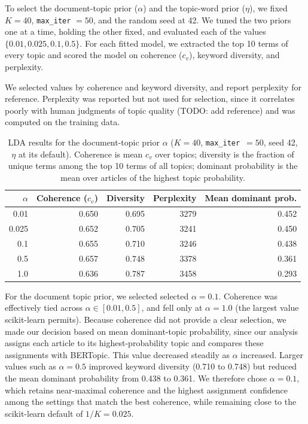 \documentclass[conference]{IEEEtran}
\begin{document}
To select the document-topic prior ($\alpha$) and the topic-word prior ($\eta$), we fixed $K = 40$, \texttt{max\_iter} $= 50$, and the random seed at 42. We tuned the two priors one at a time, holding the other fixed, and evaluated each of the values $\{0.01, 0.025, 0.1, 0.5\}$. For each fitted model, we extracted the top 10 terms of every topic and scored the model on coherence ($c_v$), keyword diversity, and perplexity.

We selected values by coherence and keyword diversity, and report perplexity for reference. Perplexity was reported but not used for selection, since it correlates poorly with human judgments of topic quality (TODO: add reference) and was computed on the training data.

\begin{table}[ht]
\centering
\caption{LDA results for the document-topic prior $\alpha$ ($K=40$, \texttt{max\_iter}~$=50$, seed 42, $\eta$ at its default). Coherence is mean $c_v$ over topics; diversity is the fraction of unique terms among the top 10 terms of all topics; dominant probability is the mean over articles of the highest topic probability.}
\label{tab:alpha}
\begin{tabular}{rrrrr}
\hline
$\alpha$ & Coherence ($c_v$) & Diversity & Perplexity & Mean dominant prob. \\
\hline
0.01  & 0.650 & 0.695 & 3279 & 0.452 \\
0.025 & 0.652 & 0.705 & 3241 & 0.450 \\
0.1   & 0.655 & 0.710 & 3246 & 0.438 \\
0.5   & 0.657 & 0.748 & 3378 & 0.361 \\
1.0   & 0.636 & 0.787 & 3458 & 0.293 \\
\hline
\end{tabular}
\end{table}

For the document topic prior, we selected selected $\alpha = 0.1$. Coherence was effectively tied across $\alpha \in [0.01, 0.5]$, and fell only at $\alpha = 1.0$ (the largest value scikit-learn permits). Because coherence did not provide a clear selection, we made our decision based on mean dominant-topic probability, since our analysis assigns each article to its highest-probability topic and compares these assignments with BERTopic. This value decreased steadily as $\alpha$ increased. Larger values such as $\alpha = 0.5$ improved keyword diversity (0.710 to 0.748) but reduced the mean dominant probability from 0.438 to 0.361. We therefore chose $\alpha = 0.1$, which retains near-maximal coherence and the highest assignment confidence among the settings that match the best coherence, while remaining close to the scikit-learn default of $1/K = 0.025$.
\end{document}
